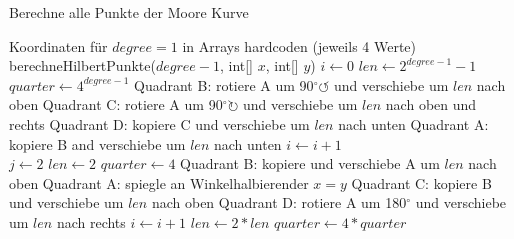 \documentclass[course=erap]{aspdoc}
\begin{document}
\begin{algorithm}[H]
\begin{algorithmic}
\caption{Berechne alle Punkte der Moore Kurve}
\label{moore:batch}
\State Koordinaten für $degree =1$ in Arrays hardcoden (jeweils 4 Werte)
	\Return
\EndIf	
\State berechneHilbertPunkte($degree - 1$, int[] $x$, int[] $y$)
\State $i \leftarrow 0$
\State $len \leftarrow 2^{degree - 1} -1$ 
\State $quarter \leftarrow 4^{degree-1}$
\State Quadrant B: rotiere A um 90$^{\circ}\circlearrowleft$ und verschiebe um $len$ nach oben
\State Quadrant C: rotiere A um 90$^{\circ}\circlearrowright$ und verschiebe um $len$ nach oben und rechts
\State Quadrant D: kopiere C und verschiebe um $len$ nach unten
\State Quadrant A: kopiere B and verschiebe um $len$ nach unten
\State $i \leftarrow i+1$
\EndWhile
\EndFunction
\ \\
\State $j \leftarrow 2$
\State $len \leftarrow 2$ 
\State $quarter \leftarrow 4$
	\State Quadrant B: kopiere und verschiebe A um $len$ nach oben
	\State Quadrant A: spiegle an Winkelhalbierender $x=y$
	\State Quadrant C: kopiere B und verschiebe um $len$ nach oben
	\State Quadrant D: rotiere A  um 180$^{\circ}$ und verschiebe um $len$ nach rechts
\EndWhile
\State $i \leftarrow i+1$
\State $len \leftarrow 2*len$
\State $quarter \leftarrow 4*quarter$
\EndWhile
\EndFunction
\end{algorithmic}
\end{algorithm}
\end{document}
